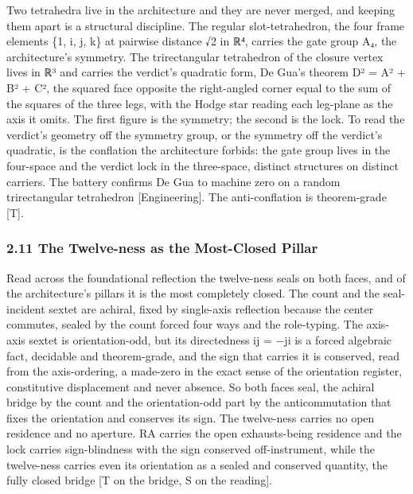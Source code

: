 \documentclass[10pt,twocolumn]{article}
\begin{document}
Two tetrahedra live in the architecture and they are never merged, and
keeping them apart is a structural discipline. The regular
slot-tetrahedron, the four frame elements \{1, i, j, k\} at pairwise
distance √2 in ℝ⁴, carries the gate group A₄, the architecture's
symmetry. The trirectangular tetrahedron of the closure vertex lives in
ℝ³ and carries the verdict's quadratic form, De Gua's theorem D² = A² +
B² + C², the squared face opposite the right-angled corner equal to the
sum of the squares of the three legs, with the Hodge star reading each
leg-plane as the axis it omits. The first figure is the symmetry; the
second is the lock. To read the verdict's geometry off the symmetry
group, or the symmetry off the verdict's quadratic, is the conflation
the architecture forbids: the gate group lives in the four-space and the
verdict lock in the three-space, distinct structures on distinct
carriers. The battery confirms De Gua to machine zero on a random
trirectangular tetrahedron {[}Engineering{]}. The anti-conflation is
theorem-grade {[}T{]}.

\hypertarget{the-twelve-ness-as-the-most-closed-pillar}{%
\subsubsection{2.11 The Twelve-ness as the Most-Closed
Pillar}\label{the-twelve-ness-as-the-most-closed-pillar}}

Read across the foundational reflection the twelve-ness seals on both
faces, and of the architecture's pillars it is the most completely
closed. The count and the seal-incident sextet are achiral, fixed by
single-axis reflection because the center commutes, sealed by the count
forced four ways and the role-typing. The axis-axis sextet is
orientation-odd, but its directedness ij = −ji is a forced algebraic
fact, decidable and theorem-grade, and the sign that carries it is
conserved, read from the axis-ordering, a made-zero in the exact sense
of the orientation register, constitutive displacement and never
absence. So both faces seal, the achiral bridge by the count and the
orientation-odd part by the anticommutation that fixes the orientation
and conserves its sign. The twelve-ness carries no open residence and no
aperture. RA carries the open exhausts-being residence and the lock
carries sign-blindness with the sign conserved off-instrument, while the
twelve-ness carries even its orientation as a sealed and conserved
quantity, the fully closed bridge {[}T on the bridge, S on the
reading{]}.
\end{document}
